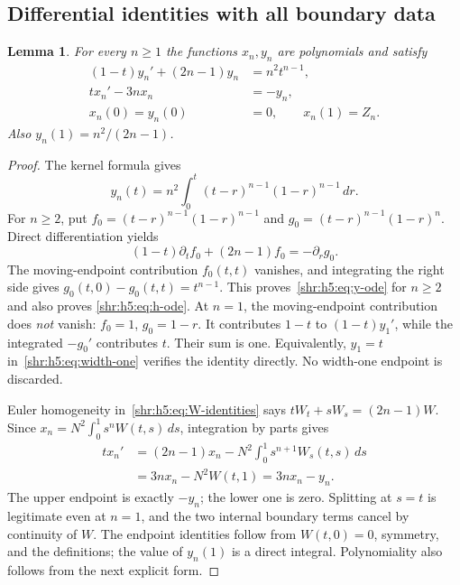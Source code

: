 \documentclass[11pt,letterpaper]{article}
\numberwithin{equation}{section}
\newtheorem{lemma}[theorem]{Lemma}
\theoremstyle{definition}
\newcommand{\1}{\mathbf 1}
\newcommand{\dd}{\,d}
\begin{document}
\subsection{Differential identities with all boundary data}
\begin{lemma}\label{shr:h5:lem:odes}
For every $n\ge1$ the functions $x_n,y_n$ are polynomials and satisfy
\begin{align}
 (1-t)y_n'+(2n-1)y_n&=n^2t^{n-1},
 \label{shr:h5:eq:y-ode}\\
 tx_n'-3nx_n&=-y_n,
 \label{shr:h5:eq:x-ode}\\
 x_n(0)=y_n(0)&=0,\qquad x_n(1)=Z_n.
 \label{shr:h5:eq:endpoints}
\end{align}
Also $y_n(1)=n^2/(2n-1)$.
\end{lemma}
\begin{proof}
The kernel formula gives
\[
 y_n(t)=n^2\int_0^t(t-r)^{n-1}(1-r)^{n-1}\dd r.
\]
For $n\ge2$, put
$f_0=(t-r)^{n-1}(1-r)^{n-1}$ and
$g_0=(t-r)^{n-1}(1-r)^n$. Direct differentiation yields
\[
 (1-t)\partial_tf_0+(2n-1)f_0=-\partial_rg_0.
\]
The moving-endpoint contribution $f_0(t,t)$ vanishes, and integrating
the right side gives $g_0(t,0)-g_0(t,t)=t^{n-1}$.
This proves~\eqref{shr:h5:eq:y-ode} for $n\ge2$ and also proves
\eqref{shr:h5:eq:h-ode}. At $n=1$, the moving-endpoint contribution does
\emph{not} vanish: $f_0=1$, $g_0=1-r$. It contributes $1-t$ to
$(1-t)y_1'$, while the integrated $-g_0'$ contributes $t$. Their sum
is one. Equivalently, $y_1=t$ in~\eqref{shr:h5:eq:width-one} verifies the
identity directly. No width-one endpoint is discarded.

Euler homogeneity in~\eqref{shr:h5:eq:W-identities} says
$tW_t+sW_s=(2n-1)W$. Since
$x_n=N^2\int_0^1s^nW(t,s)\dd s$, integration by parts gives
\begin{align*}
 tx_n'&=(2n-1)x_n-N^2\int_0^1s^{n+1}W_s(t,s)\dd s\\
      &=3nx_n-N^2W(t,1)=3nx_n-y_n.
\end{align*}
The upper endpoint is exactly $-y_n$; the lower one is zero. Splitting
at $s=t$ is legitimate even at $n=1$, and the two internal boundary
terms cancel by continuity of $W$. The endpoint identities follow from
$W(t,0)=0$, symmetry, and the definitions; the value of $y_n(1)$ is a
direct integral. Polynomiality also follows from the next explicit form.
\end{proof}
\end{document}
